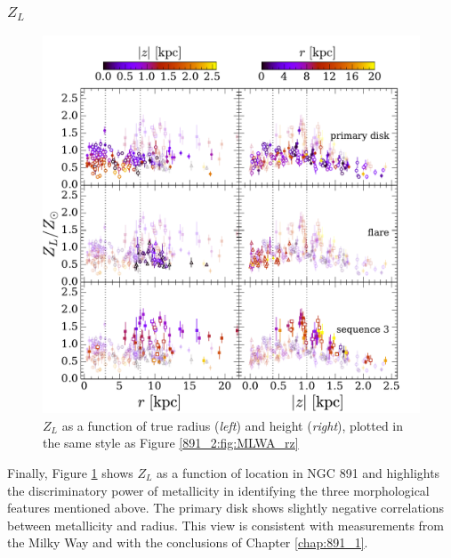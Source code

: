 
\subsubsection{{\Large $Z_L$}}

\begin{figure}
  \centering
  \includegraphics[width=\textwidth]{891_2/figs/MLWZ_rz_all.pdf}
  \caption[$Z_L$ vs
    ($r,|z|$)]{\fixspacing\label{891_2:fig:MLWZ_rz}$Z_L$ as a function
    of true radius (\emph{left}) and height (\emph{right}), plotted in
    the same style as Figure \ref{891_2:fig:MLWA_rz}}
\end{figure}

Finally, Figure \ref{891_2:fig:MLWZ_rz} shows $Z_L$ as a function of
location in NGC 891 and highlights the discriminatory power of
metallicity in identifying the three morphological features mentioned
above. The primary disk shows slightly negative correlations between
metallicity and radius. This view is consistent with measurements from
the Milky Way \citep{Bovy12, Hayden14} and with the conclusions of
Chapter \ref{chap:891_1}.

